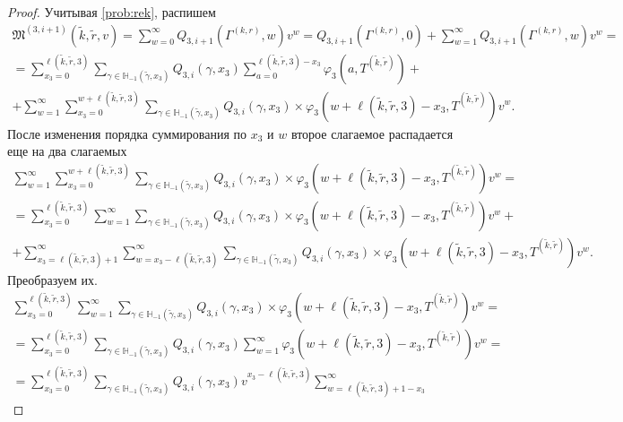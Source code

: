 \documentclass[a4paper,12pt,russian]{extarticle}
\begin{document}
\begin{proof}
Учитывая \eqref{prob:rek}, распишем
\begin{multline}
\mathfrak{M}^{(3,i+1)}(\tilde{k},\tilde{r},v) =\sum_{w=0}^{\infty} Q_{3,i+1}(\Gamma^{(k,r)},w) v^w = Q_{3,i+1}(\Gamma^{(k,r)},0) + \sum_{w=1}^{\infty} Q_{3,i+1}(\Gamma^{(k,r)},w) v^w =\\
=\sum_{x_3=0}^{\ell(\tilde{k},\tilde{r},3)}\sum_{\gamma \in {\mathbb H}_{-1}(\tilde{\gamma},x_3)} Q_{3,i}(\gamma,x_3) \sum_{a=0}^{\ell(\tilde{k},\tilde{r},3) - x_3} \varphi_3(a,T^{(\tilde{k},\tilde{r})}) + \\
+ \sum_{w=1}^{\infty} \sum_{x_3=0}^{w +  \ell(\tilde{k},\tilde{r},3)}\sum_{\gamma \in {\mathbb H}_{-1}(\tilde{\gamma},x_3)} Q_{3,i}(\gamma,x_3) \times 
\varphi_3(w + \ell(\tilde{k},\tilde{r},3) - x_3,T^{(\tilde{k},\tilde{r})}) v^w.
\label{sum:zero}
\end{multline}
После изменения порядка суммирования по $x_3$ и $w$ второе слагаемое распадается еще на два слагаемых
\begin{multline}
\sum_{w=1}^{\infty} \sum_{x_3=0}^{w +  \ell(\tilde{k},\tilde{r},3)}\sum_{\gamma \in {\mathbb H}_{-1}(\tilde{\gamma},x_3)} Q_{3,i}(\gamma,x_3) \times 
\varphi_3(w + \ell(\tilde{k},\tilde{r},3) - x_3,T^{(\tilde{k},\tilde{r})}) v^w = \\
= \sum_{x_3=0}^{\ell(\tilde{k},\tilde{r},3)}\sum_{w=1}^{\infty}\sum_{\gamma \in {\mathbb H}_{-1}(\tilde{\gamma},x_3)} Q_{3,i}(\gamma,x_3) \times 
\varphi_3(w + \ell(\tilde{k},\tilde{r},3) - x_3,T^{(\tilde{k},\tilde{r})}) v^w + \\
+\sum_{x_3=\ell(\tilde{k},\tilde{r},3) + 1}^{\infty}\sum_{w=x_3-\ell(\tilde{k},\tilde{r},3)}^{\infty}\sum_{\gamma \in {\mathbb H}_{-1}(\tilde{\gamma},x_3)} Q_{3,i}(\gamma,x_3) \times 
\varphi_3(w + \ell(\tilde{k},\tilde{r},3) - x_3,T^{(\tilde{k},\tilde{r})}) v^w.
\label{double:sum}
\end{multline}
Преобразуем их.
\begin{multline}
 \sum_{x_3=0}^{\ell(\tilde{k},\tilde{r},3)}\sum_{w=1}^{\infty}  \sum_{\gamma \in {\mathbb H}_{-1}(\tilde{\gamma},x_3)} Q_{3,i}(\gamma,x_3) \times 
\varphi_3(w + \ell(\tilde{k},\tilde{r},3) - x_3,T^{(\tilde{k},\tilde{r})}) v^w = \\
=  \sum_{x_3=0}^{\ell(\tilde{k},\tilde{r},3)}  \sum_{\gamma \in {\mathbb H}_{-1}(\tilde{\gamma},x_3)} Q_{3,i}(\gamma,x_3)  \sum_{w=1}^{\infty} 
\varphi_3(w + \ell(\tilde{k},\tilde{r},3) - x_3,T^{(\tilde{k},\tilde{r})}) v^w = \\
=\sum_{x_3=0}^{\ell(\tilde{k},\tilde{r},3)}  \sum_{\gamma \in {\mathbb H}_{-1}(\tilde{\gamma},x_3)} Q_{3,i}(\gamma,x_3) v^{x_3-\ell(\tilde{k},\tilde{r},3)}  \sum_{w=\ell(\tilde{k},\tilde{r},3) + 1 -x_3}^{\infty}

\end{multline}
\end{proof}
\end{document}
